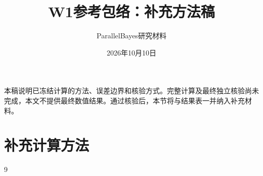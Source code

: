 \documentclass[UTF8,fontset=fandol,zihao=-4]{ctexart}
\title{W1参考包络：补充方法稿}
\author{ParallelBayes研究材料}\date{2026年10月10日}
\begin{document}
\maketitle
\noindent 本稿说明已冻结计算的方法、误差边界和核验方式。完整计算及最终独立核验尚未完成，本文不提供最终数值结果。通过核验后，本节将与结果表一并纳入补充材料。
\section{补充计算方法}

\begin{thebibliography}{9}

\end{thebibliography}
\end{document}
